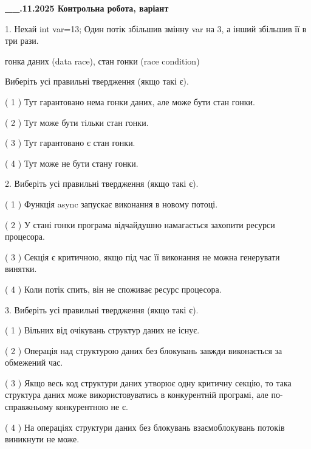 \documentclass[12pt, ukrainian]{article}
\begin{document}
\newpage
\begin {large}

\textbf{\_\_.11.2025 Контрольна робота, варіант  }\par


{
1. Нехай int var=13; Один потік збільшив змінну var на 3, а інший збільшив її в три рази.

гонка даних (data race), стан гонки (race condition)

Виберіть усі правильні твердження (якщо такі є).\par
\vspace{2mm}
( 1 ) Тут гарантовано нема гонки даних, але може бути стан гонки.%

( 2 ) Тут може бути тільки стан гонки.%

( 3 ) Тут гарантовано є стан гонки.%

( 4 ) Тут може не бути стану гонки.%


2. Виберіть усі правильні твердження (якщо такі є).\par
\vspace{2mm}

( 1 ) Функція async запускає виконання в новому потоці.%

( 2 ) У стані гонки програма відчайдушно намагається захопити ресурси процесора.%

( 3 ) Секція є критичною, якщо під час її виконання не можна генерувати винятки.%

( 4 ) Коли потік спить, він не споживає ресурс процесора.%


3. Виберіть усі правильні твердження (якщо такі є).\par
\vspace{2mm}

( 1 ) Вільних від очікувань структур даних не існує.%

( 2 ) Операція над структурою даних без блокувань завжди виконається за обмежений час.%

( 3 ) Якщо весь код структури даних утворює одну критичну секцію, то така структура даних може використовуватись в конкурентній програмі, але по-справжньо\-му конкурентною не є.%

( 4 ) На операціях структури даних без блокувань взаємоблокувань потоків виникнути не може.%


}
\end{large}
\end{document}
